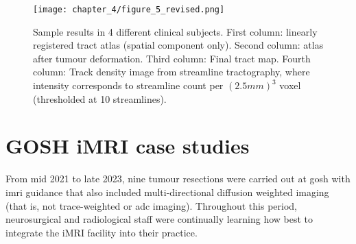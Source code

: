 \begin{figure*}[h!]
  \centering
  \texttt{[image: chapter\_4/figure\_5\_revised.png]}
  \caption{Sample results in 4 different clinical subjects. First column: linearly registered tract atlas (spatial component only). Second column: atlas after tumour deformation. Third column: Final tract map. Fourth column: Track density image from streamline tractography, where intensity corresponds to streamline count per $(2.5mm)^3$ voxel (thresholded at 10 streamlines).}
  \label{fig:res}
\end{figure*}


\clearpage
\section{GOSH iMRI case studies}\label{sec:case}

From mid 2021 to late 2023, nine tumour resections were carried out at \gls{gosh} with \gls{imri} guidance that also included multi-directional diffusion weighted imaging (that is, not trace-weighted or \gls{adc} imaging).
Throughout this period, neurosurgical and radiological staff were continually learning how best to integrate the iMRI facility into their practice.

